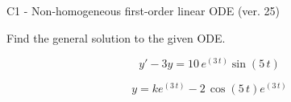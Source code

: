 \begin{exercise}
  \begin{exerciseTitle}C1 - Non-homogeneous first-order linear ODE (ver. 25)\end{exerciseTitle}
  \begin{exerciseStatement}
    
Find the general solution to the given ODE.

    
\[y'-3y= 10 \, e^{\left(3 \, t\right)} \sin\left(5 \, t\right)\]

  \end{exerciseStatement}
  \begin{exerciseAnswer}
    
\[y= k e^{\left(3 \, t\right)} - 2 \, \cos\left(5 \, t\right) e^{\left(3 \, t\right)}\]

  \end{exerciseAnswer}
\end{exercise}